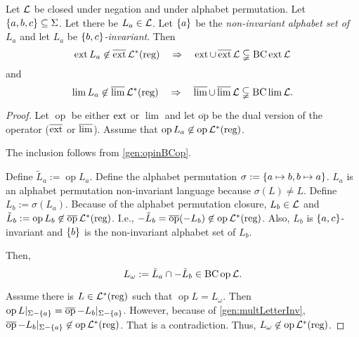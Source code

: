 \begin{theorem}
\label{gen:extInBCext}
Let $\mathcal{L}$ be closed under negation and under alphabet permutation. Let $\Set{a,b,c} \subseteq \Sigma$. Let there be $L_a \in \mathcal{L}$. Let $\Set{a}$ be the \emph{non-invariant alphabet set of $L_a$} and let $L_a$ be \emph{$\Set{b,c}$-invariant}. Then
\[ \ext L_a \not\in \dext \Langreg \ \ \ \Rightarrow \ \ \ \ext \cup \dext \Lang \subsetneqq \BC \ext \Lang \]
and
\[ \lim L_a \not\in \operatorname{\overline{lim}} \mathcal{L}^*(\text{reg}) \ \ \ \Rightarrow \ \ \ \operatorname{\overline{lim}} \cup \operatorname{\overline{lim}} \mathcal{L} \subsetneqq \operatorname{BC} \lim \mathcal{L} . \]
\begin{proof}
\def\op{\operatorname{op}}
\def\dop{\operatorname{\overline{op}}}
Let $\op$ be either $\operatorname{ext}$ or $\lim$ and let $\dop$ be the dual version of the operator ($\operatorname{\overline{ext}}$ or $\operatorname{\overline{lim}}$). Assume that $\op L_a \not\in \op \Langreg$.

The inclusion follows from \cref{gen:opinBCop}.

Define $\tilde L_a := \op L_a$. Define the alphabet permutation $\sigma := \Set{a \mapsto b, b \mapsto a}$. $L_a$ is an alphabet permutation non-invariant language because $\sigma(L) \neq L$. Define $L_b := \sigma(L_a)$. Because of the alphabet permutation closure, $L_b \in \mathcal{L}$ and $\tilde L_b := \op L_b \not\in \dop \Langreg$. I.e., $-\tilde L_b = \dop (-L_b) \not\in \op \Langreg$. Also, $L_b$ is $\Set{a,c}$-invariant and $\Set{b}$ is the non-invariant alphabet set of $L_b$.

Then,
\[ L_\omega := \tilde L_a \cap -\tilde L_b \in \BC \op \Lang . \]

Assume there is $L \in \mathcal{L}^*(\text{reg})$ such that $\op L =  L_\omega$. Then $\op L|_{\Sigma-\Set{a}} = \dop -L_b |_{\Sigma-\Set{a}}$. However, because of \cref{gen:multLetterInv}, $\dop {-L_b} |_{\Sigma-\Set{a}} \not\in \op \Langreg$. That is a contradiction. Thus, $L_\omega \not\in \op \Langreg$.


\end{proof}
\end{theorem}
